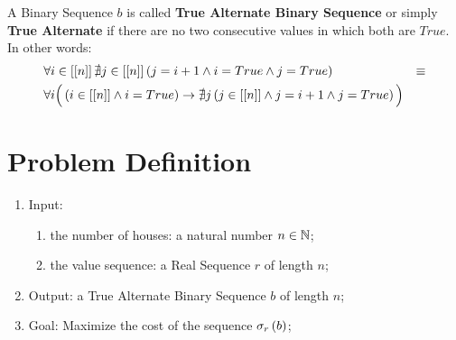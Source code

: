 \begin{defn}
    A Binary Sequence $b$ is called \textbf{True Alternate Binary Sequence} or simply \textbf{True Alternate} if there are no two consecutive values in which both are $True$. In other words:
    \begin{align}
        & \forall i \in \range{n} \nexists j \in \range{n} \left(
            j = i + 1
            \land
            i = True
            \land
            j = True
        \right)
        & \equiv \\\nonumber
        &
        \forall i \Big(
            \left(i \in \range{n} \land i = True\right)
            \rightarrow
            \nexists j \left(
                j \in \range{n}
                \land
                j = i + 1
                \land
                j = True
            \right)
        \Big) &
    \end{align}
\end{defn}

\section{Problem Definition}

\begin{enumerate}
    \item Input:
    \begin{enumerate}
        \item the number of houses: a natural number $n \in \N$;
        \item the value sequence: a Real Sequence $r$ of length $n$;
    \end{enumerate}
    \item Output: a True Alternate Binary Sequence $b$ of length $n$;
    \item Goal: Maximize the cost of the sequence $\cost{b}{r}$;
\end{enumerate}
